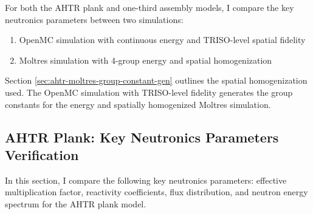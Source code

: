 For both the \gls{AHTR} plank and one-third assembly models, I compare the key neutronics 
parameters between two simulations:
\begin{enumerate}
    \item OpenMC simulation with continuous energy and TRISO-level spatial fidelity 
    \item Moltres simulation with 4-group energy and spatial homogenization
\end{enumerate}
Section \ref{sec:ahtr-moltres-group-constant-gen} outlines the spatial homogenization used.
The OpenMC simulation with TRISO-level fidelity generates the group constants for the 
energy and spatially homogenized Moltres simulation. 

\subsection{AHTR Plank: Key Neutronics Parameters Verification}
In this section, I compare the following key neutronics parameters: effective multiplication 
factor, reactivity coefficients, flux distribution, and neutron energy spectrum for the 
\gls{AHTR} plank model. 

